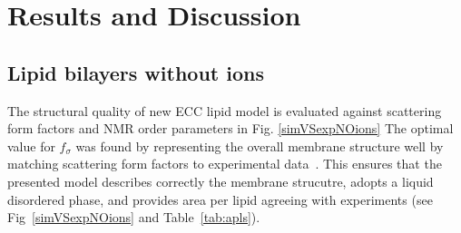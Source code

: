 \documentclass[aip,jcp,twocolumn]{revtex4}
\begin{document}

\section{Results and Discussion}

\subsection{Lipid bilayers without ions}
The structural quality of
new ECC lipid model is evaluated against scattering form factors and NMR order parameters
in Fig. \ref{simVSexpNOions}
The optimal value for $f_\sigma$ was found by representing the overall membrane structure well
by matching scattering form factors to experimental data~\cite{Petrache06, Kucerka08, Pabst10}.
This ensures that the presented model describes correctly the membrane strucutre,
adopts a liquid disordered phase, 
and provides area per lipid agreeing with experiments (see Fig~\ref{simVSexpNOions} and Table~\ref{tab:apls}). 
\end{document}
